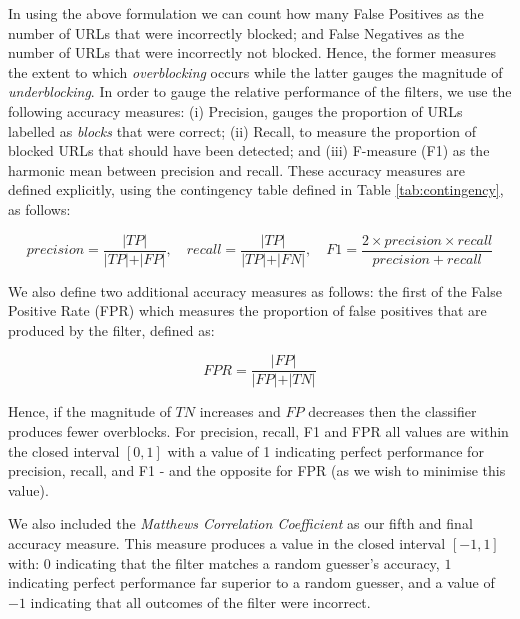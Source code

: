 \documentclass{bmcart}
\begin{document}
In using the above formulation we can count how many False Positives as the number of URLs that were incorrectly blocked; and False Negatives as the number of URLs that were incorrectly not blocked.
Hence, the former measures the extent to which \textit{overblocking} occurs while the latter gauges the magnitude of \textit{underblocking}.
In order to gauge the relative performance of the filters, we use the following accuracy measures: (i) Precision, gauges the proportion of URLs labelled as \textit{blocks} that were correct; (ii) Recall, to measure the proportion of blocked URLs that should have been detected; and (iii) F-measure (F1) as the harmonic mean between precision and recall.
These accuracy measures are defined explicitly, using the contingency table defined in Table \ref{tab:contingency}, as follows:
	
\begin{equation}
precision = \frac{\vert TP \vert}{\vert TP \vert  + \vert FP \vert}, \quad recall = \frac{\vert TP \vert }{ \vert TP \vert  + \vert FN \vert}, \quad F1 = \frac{ 2 \times precision \times recall }{precision + recall} 
\end{equation}
	
We also define two additional accuracy measures as follows: the first of the False Positive Rate (FPR) which measures the proportion of false positives that are produced by the filter, defined as:

\begin{equation}
FPR = \frac{\vert FP \vert}{ \vert FP \vert + \vert TN \vert}
\end{equation}

Hence, if the magnitude of $TN$ increases and $FP$ decreases then the classifier produces fewer overblocks.
For precision, recall, F1 and FPR all values are within the closed interval $[0,1]$ with a value of 1 indicating perfect performance for precision, recall, and F1 - and the opposite for FPR (as we wish to minimise this value).

We also included the \textit{Matthews Correlation Coefficient} as our fifth and final accuracy measure.
This measure produces a value in the closed interval $[-1, 1]$ with: $0$ indicating that the filter matches a random guesser's accuracy, $1$ indicating perfect performance far superior to a random guesser, and a value of $-1$ indicating that all outcomes of the filter were incorrect.
\end{document}
